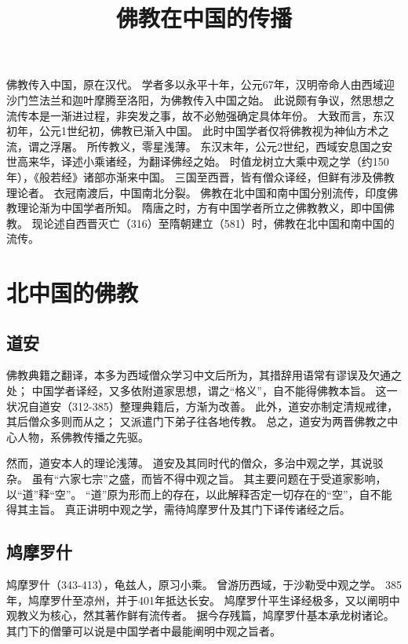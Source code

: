 \documentclass[11pt]{article}
\title{佛教在中国的传播}
\date{}
\begin{document}
  \maketitle

  \linenumbers
  
佛教传入中国，原在汉代。
学者多以永平十年，公元67年，汉明帝命人由西域迎沙门竺法兰和迦叶摩腾至洛阳，为佛教传入中国之始。
此说颇有争议，然思想之流传本是一渐进过程，非突发之事，故不必勉强确定具体年份。
大致而言，东汉初年，公元1世纪初，佛教已渐入中国。
此时中国学者仅将佛教视为神仙方术之流，谓之浮屠。
所传教义，零星浅薄。
东汉末年，公元2世纪，西域安息国之安世高来华，译述小乘诸经，为翻译佛经之始。
时值龙树立大乘中观之学（约150年），《般若经》诸部亦渐来中国。
三国至西晋，皆有僧众译经，但鲜有涉及佛教理论者。
衣冠南渡后，中国南北分裂。
佛教在北中国和南中国分别流传，印度佛教理论渐为中国学者所知。
隋唐之时，方有中国学者所立之佛教教义，即中国佛教。
现论述自西晋灭亡（316）至隋朝建立（581）时，佛教在北中国和南中国的流传。

\section{北中国的佛教}
\subsection{道安}
佛教典籍之翻译，本多为西域僧众学习中文后所为，其措辞用语常有谬误及欠通之处；
中国学者译经，又多依附道家思想，谓之“格义”，自不能得佛教本旨。
这一状况自道安（312-385）整理典籍后，方渐为改善。
此外，道安亦制定清规戒律，其后僧众多则而从之；
又派遣门下弟子往各地传教。
总之，道安为两晋佛教之中心人物，系佛教传播之先驱。

\par

然而，道安本人的理论浅薄。
道安及其同时代的僧众，多治中观之学，其说驳杂。
虽有“六家七宗”之盛，而皆不得中观之旨。
其主要问题在于受道家影响，以“道”释“空”。
“道”原为形而上的存在，以此解释否定一切存在的“空”，自不能得其主旨。
真正讲明中观之学，需待鸠摩罗什及其门下译传诸经之后。

\subsection{鸠摩罗什}
鸠摩罗什（343-413），龟兹人，原习小乘。
曾游历西域，于沙勒受中观之学。
385年，鸠摩罗什至凉州，并于401年抵达长安。
鸠摩罗什平生译经极多，又以阐明中观教义为核心，然其著作鲜有流传者。
据今存残篇，鸠摩罗什基本承龙树诸论。
其门下的僧肇可以说是中国学者中最能阐明中观之旨者。
\end{document}
